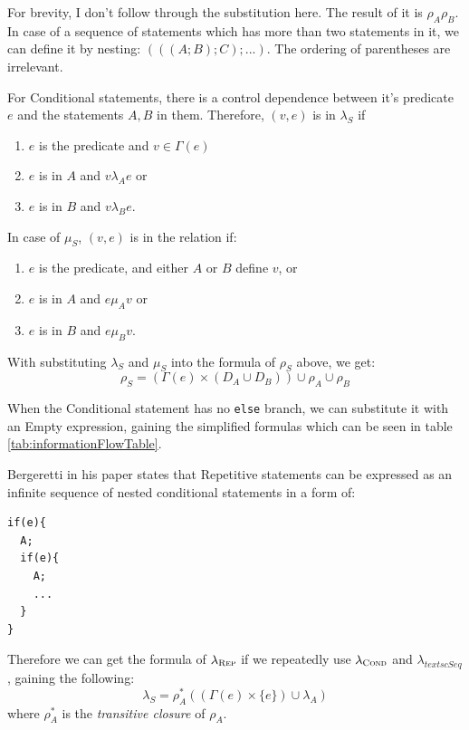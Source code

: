 \documentclass[oneside,12pt,a4paper]{book}
\begin{document}
For brevity, I don't follow through the substitution here. The result of it is $\rho_A\rho_B$. 
In case of a sequence of statements which has more than two statements in it, we can define it by nesting: $(((A;B);C);...)$. The ordering of parentheses are irrelevant.

For Conditional statements, there is a control dependence between it's predicate $e$ and the statements $A,B$ in them. Therefore,
$(v,e)$ is in $\lambda_S$ if
\begin{enumerate}
\item $e$ is the predicate and $v \in \Gamma(e)$
\item $e$ is in $A$ and $v \lambda_A e$ or
\item $e$ is in $B$ and $v \lambda_B e$.
\end{enumerate}

In case of $\mu_S$, $(v,e)$ is in the relation if:
\begin{enumerate}
\item $e$ is the predicate, and either $A$ or $B$ define $v$, or
\item $e$ is in $A$ and $e \mu_A v$ or
\item $e$ is in $B$ and $e \mu_B v$.
\end{enumerate}

With substituting $\lambda_S$ and $\mu_S$ into the formula of $\rho_S$ above, we get:
\begin{equation}
\rho_S = (\Gamma(e) \times (D_A \cup D_B)) \cup \rho_A \cup \rho_B
\end{equation}

When the Conditional statement has no \texttt{else} branch, we can substitute it with an Empty expression, gaining the simplified formulas which can be seen in table \ref{tab:informationFlowTable}.

Bergeretti in his paper states that Repetitive statements can be expressed as an infinite sequence of nested conditional  statements in a form of:
\begin{lstlisting}
if(e){
  A;
  if(e){
    A;
    ...
  }
}
\end{lstlisting}

Therefore we can get the formula of $\lambda_{\textsc{Rep}}$ if we repeatedly use $\lambda_{\textsc{Cond}}$ and $\lambda_{textsc{Seq}}$, gaining the following:
\begin{equation}
\lambda_S = \rho^*_A((\Gamma(e) \times \{e\}) \cup \lambda_A)
\end{equation}
where $\rho^*_A$ is the \textit{transitive closure} of $\rho_A$.
\end{document}
